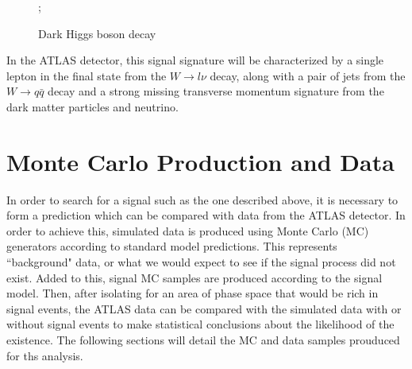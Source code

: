 \begin{figure}[H]
    \centering
    ;
    \caption{Dark Higgs boson decay}
    \label{fig:dh_feynman}
\end{figure}

In the ATLAS detector, this signal signature will be characterized by a single lepton in the final state from the $ W \rightarrow l\nu $ decay, along with a pair of jets from the $ W \rightarrow q\bar{q} $ decay and a strong missing transverse momentum signature from the dark matter particles and neutrino.

\section{Monte Carlo Production and Data}
\label{section:mc_prod}
In order to search for a signal such as the one described above, it is necessary to form a prediction which can be compared with data from the ATLAS detector. In order to achieve this, simulated data is produced using Monte Carlo (MC) generators according to standard model predictions. This represents ``background" data, or what we would expect to see if the signal process did not exist. Added to this, signal MC samples are produced according to the signal model. Then, after isolating for an area of phase space that would be rich in signal events, the ATLAS data can be compared with the simulated data with or without signal events to make statistical conclusions about the likelihood of the existence. The following sections will detail the MC and data samples prouduced for ths analysis.

